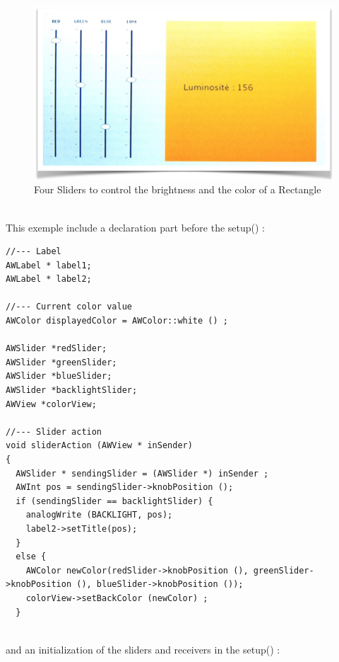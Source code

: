 \documentclass[a4paper,11pt]{extarticle}
\begin{document}
\begin{figure}[htbp]
   \centering
   \includegraphics[scale=0.55]{AWFig12.png} 
   \caption{Four Sliders to control the brightness and the color of a Rectangle}
   \label{fig:12 }
\end{figure}

~\\ This exemple include a declaration part before the setup() :

\begin{lstlisting}[language=Arduinonl]
//--- Label
AWLabel * label1;
AWLabel * label2;

//--- Current color value
AWColor displayedColor = AWColor::white () ;

AWSlider *redSlider;
AWSlider *greenSlider;
AWSlider *blueSlider;
AWSlider *backlightSlider;
AWView *colorView;

//--- Slider action
void sliderAction (AWView * inSender)
{
  AWSlider * sendingSlider = (AWSlider *) inSender ;
  AWInt pos = sendingSlider->knobPosition ();
  if (sendingSlider == backlightSlider) {
    analogWrite (BACKLIGHT, pos);
    label2->setTitle(pos);
  }
  else {
    AWColor newColor(redSlider->knobPosition (), greenSlider->knobPosition (), blueSlider->knobPosition ());
    colorView->setBackColor (newColor) ;
  }
  \end{lstlisting}

~\\ and an initialization of the sliders and receivers in the setup() :
\end{document}
